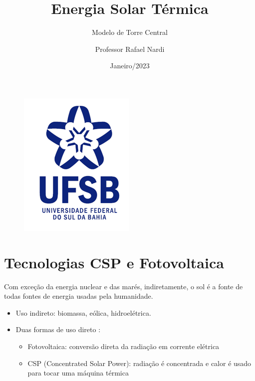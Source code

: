 \documentclass[12pt,notheorems,hyperref={pdfauthor=Professor Rafael Nardi}]{beamer}
\title{Energia Solar Térmica}
\subtitle{Modelo de Torre Central}
\author{Professor Rafael Nardi}
\institute{UFSB}
\date{Janeiro/2023}
\begin{document}
{
\begin{frame}%
  \titlepage
	\begin{figure}[b]
		\centering
		\includegraphics[scale=0.5]{./logo_ufsb.png}
	\end{figure}
\end{frame}
}

\addtocounter{framenumber}{-1}

\section{Tecnologias CSP e Fotovoltaica}

\begin{frame}%

	Com exceção da energia nuclear e das marés, indiretamente, o sol é a fonte de todas
	fontes de energia usadas pela humanidade. \pause

	\bigskip

	\begin{itemize}
			\item Uso indireto: biomassa, eólica, hidroelétrica.
	\end{itemize} \pause

	\bigskip

	\begin{itemize}
		\item Duas formas de uso direto :
			\medskip
		\begin{itemize}
			\item Fotovoltaica: conversão direta da radiação em corrente elétrica \pause
			\medskip
			\item CSP (Concentrated Solar Power): radiação é concentrada e calor é usado para tocar uma máquina térmica
		\end{itemize}

	\end{itemize}

\end{frame}
\end{document}
